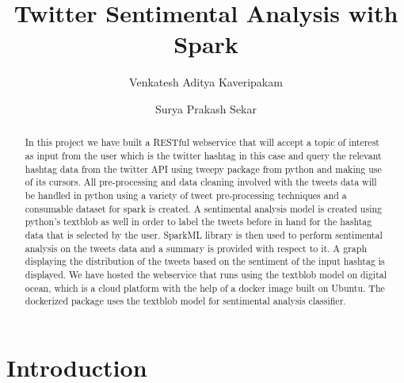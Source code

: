 

\title{Twitter Sentimental Analysis with Spark}


\author{Venkatesh Aditya Kaveripakam}

\author{Surya Prakash Sekar}

\renewcommand{\shortauthors}{Aditya, Surya}

\begin{abstract}

In this project we have built a RESTful webservice that will accept a topic of 
interest as input from the user which is the twitter hashtag in this case and 
query the relevant hashtag data from the twitter API using tweepy package from 
python and making use of its cursors. All pre-processing and data cleaning 
involved with the tweets data will be handled in python using a variety of 
tweet pre-processing techniques and a consumable dataset for spark is created. A 
sentimental analysis model is created using python's textblob as well in order to label 
the tweets before in hand for the hashtag data that is selected by the user. 
SparkML library is then used to perform sentimental analysis on the tweets data 
and a summary is provided with respect to it. A graph displaying the 
distribution of the tweets based on the sentiment of the input hashtag is 
displayed. We have hosted the webservice that runs using the textblob model on 
digital ocean, which is a cloud platform with the help of a docker image built on 
Ubuntu. The dockerized package uses the textblob model for sentimental analysis 
classifier.

\end{abstract}


\maketitle

\section{Introduction}

